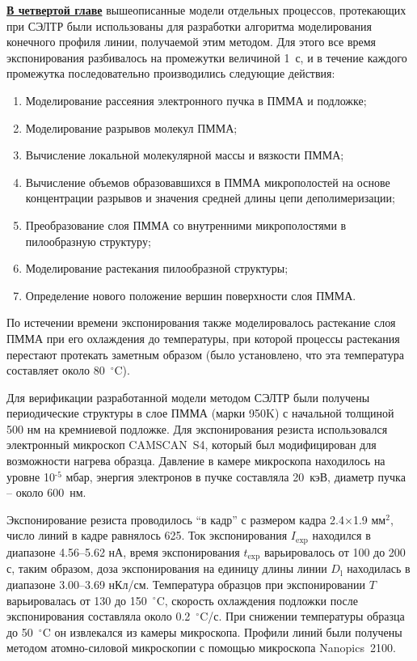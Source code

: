 \underline{\textbf{В четвертой главе}} вышеописанные модели отдельных процессов, протекающих при СЭЛТР были использованы для разработки алгоритма моделирования конечного профиля линии, получаемой этим методом. Для этого все время экспонирования разбивалось на промежутки величиной 1~с, и в течение каждого промежутка последовательно производились следующие действия: 

\begin{enumerate}
	\item Моделирование рассеяния электронного пучка в ПММА и подложке;
	\item Моделирование разрывов молекул ПММА;
	\item Вычисление локальной молекулярной массы и вязкости ПММА;
	\item Вычисление объемов образовавшихся в ПММА микрополостей на основе концентрации разрывов и значения средней длины цепи деполимеризации;
	\item Преобразование слоя ПММА со внутренними микрополостями в пилообразную структуру;
	\item Моделирование растекания пилообразной структуры;
	\item Определение нового положение вершин поверхности слоя ПММА.
\end{enumerate}
По истечении времени экспонирования также моделировалось растекание слоя ПММА при его охлаждения до температуры, при которой процессы растекания перестают протекать заметным образом (было установлено, что эта температура составляет около 80~$^\circ$C).

Для верификации разработанной модели методом СЭЛТР были получены периодические структуры в слое ПММА (марки 950K) с начальной толщиной 500 нм на кремниевой подложке. Для экспонирования резиста использовался электронный микроскоп CAMSCAN~S4, который был модифицирован для возможности нагрева образца. Давление в камере микроскопа находилось на уровне 10$^{\text{-5}}$ мбар, энергия электронов в пучке составляла 20~кэВ, диаметр пучка -- около 600~нм.

Экспонирование резиста проводилось ``в кадр'' с размером кадра 2.4$\times$1.9 мм$^\text{2}$, число линий в кадре равнялось 625. Ток экспонирования $I_\mathrm{exp}$ находился в диапазоне 4.56--5.62 нА, время экспонирования $t_\mathrm{exp}$ варьировалось от 100 до 200 с, таким образом, доза экспонирования на единицу длины линии $D_\mathrm{l}$ находилась в диапазоне 3.00--3.69 нКл/см. Температура образцов при экспонировании $T$ варьировалась от 130 до 150~$^\circ$C, скорость охлаждения подложки после экспонирования составляла около 0.2~$^\circ$C/с. При снижении температуры образца до 50~$^\circ$C он извлекался из камеры микроскопа. Профили линий были получены методом атомно-силовой микроскопии с помощью микроскопа Nanopics~2100.

